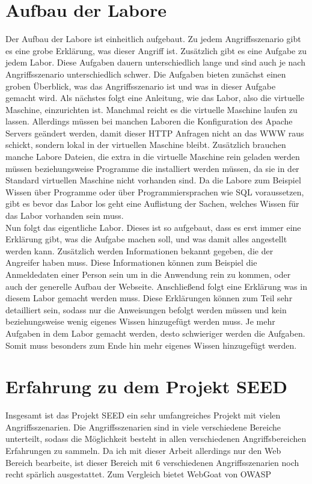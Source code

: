 \section{Aufbau der Labore}
Der Aufbau der Labore ist einheitlich aufgebaut. Zu jedem Angriffsszenario gibt es eine grobe Erklärung, was dieser Angriff ist. Zusätzlich gibt es eine Aufgabe zu jedem Labor. Diese Aufgaben dauern unterschiedlich lange und sind auch je nach Angriffsszenario unterschiedlich schwer. Die Aufgaben bieten zunächst einen groben Überblick, was das Angriffsszenario ist und was in dieser Aufgabe gemacht wird. Als nächstes folgt eine Anleitung, wie das Labor, also die virtuelle Maschine, einzurichten ist. Manchmal reicht es die virtuelle Maschine laufen zu lassen. Allerdings müssen bei manchen Laboren die Konfiguration des Apache Servers geändert werden, damit dieser HTTP Anfragen nicht an das WWW raus schickt, sondern lokal in der virtuellen Maschine bleibt. Zusätzlich brauchen manche Labore Dateien, die extra in die virtuelle Maschine rein geladen werden müssen beziehungsweise Programme die installiert werden müssen, da sie in der Standard virtuellen Maschine nicht vorhanden sind. Da die Labore zum Beispiel Wissen über Programme oder über Programmiersprachen wie SQL voraussetzen, gibt es bevor das Labor los geht eine Auflistung der Sachen, welches Wissen für das Labor vorhanden sein muss. \\
Nun folgt das eigentliche Labor. Dieses ist so aufgebaut, dass es erst immer eine Erklärung gibt, was die Aufgabe machen soll, und was damit alles angestellt werden kann. Zusätzlich werden Informationen bekannt gegeben, die der Angreifer haben muss. Diese Informationen können zum Beispiel die Anmeldedaten einer Person sein um in die Anwendung rein zu kommen, oder auch der generelle Aufbau der Webseite. Anschließend folgt eine Erklärung was in diesem Labor gemacht werden muss. Diese Erklärungen können zum Teil sehr detailliert sein, sodass nur die Anweisungen befolgt werden müssen und kein beziehungsweise wenig eigenes Wissen hinzugefügt werden muss. Je mehr Aufgaben in dem Labor gemacht werden, desto schwieriger werden die Aufgaben. Somit muss besonders zum Ende hin mehr eigenes Wissen hinzugefügt werden. 
\section{Erfahrung zu dem Projekt SEED}
Insgesamt ist das Projekt SEED ein sehr umfangreiches Projekt mit vielen Angriffsszenarien. Die Angriffsszenarien sind in viele verschiedene Bereiche unterteilt, sodass die Möglichkeit besteht in allen verschiedenen Angriffsbereichen Erfahrungen zu sammeln. Da ich mit dieser Arbeit allerdings nur den Web Bereich bearbeite, ist dieser Bereich mit 6 verschiedenen Angriffsszenarien noch recht spärlich ausgestattet. Zum Vergleich bietet WebGoat von OWASP 